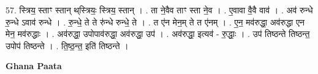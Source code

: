 \documentclass[17pt]{extarticle}
\begin{document}
57. स्त्रिय॒ स्ताꣳ स्तान् थ्‌स्त्रियः॒ स्त्रिय॒ स्तान् । . ता ने॒वैव ताꣳ स्ता ने॒व । . ए॒वावा वै॒वै वाव॑ । . अव॑ रुन्धे रु॒न्धे ऽवाव॑ रुन्धे । . रु॒न्धे॒ ते ते रु॑न्धे रुन्धे॒ ते । . त ए॑न मेन॒म् ते त ए॑नम् । . ए॒न॒ मव॑रुद्धा॒ अव॑रुद्धा एन मेन॒ मव॑रुद्धाः । . अव॑रुद्धा॒ उपोपाव॑रुद्धा॒ अव॑रुद्धा॒ उप॑ । . अव॑रुद्धा॒ इत्यव॑ - रु॒द्धाः॒ । . उप॑ तिष्ठन्ते तिष्ठन्त॒ उपोप॑ तिष्ठन्ते । . ति॒ष्ठ॒न्त॒ इति॑ तिष्ठन्ते । \newline

\textbf{Ghana Paata } \newline
\end{document}

